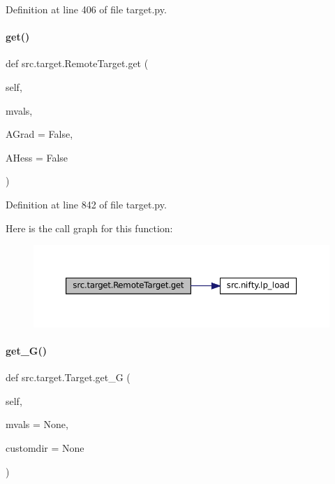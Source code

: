Definition at line 406 of file target.\+py.

\mbox{\label{classsrc_1_1target_1_1RemoteTarget_ad5a26180c653152b879d4cb82798aa23}} 
\paragraph{\texorpdfstring{get()}{get()}}
{\footnotesize\ttfamily def src.\+target.\+Remote\+Target.\+get (\begin{DoxyParamCaption}\item[{}]{self,  }\item[{}]{mvals,  }\item[{}]{A\+Grad = {\ttfamily False},  }\item[{}]{A\+Hess = {\ttfamily False} }\end{DoxyParamCaption})}



Definition at line 842 of file target.\+py.

Here is the call graph for this function\+:
\nopagebreak
\begin{figure}[H]
\begin{center}
\leavevmode
\includegraphics[width=350pt]{classsrc_1_1target_1_1RemoteTarget_ad5a26180c653152b879d4cb82798aa23_cgraph}
\end{center}
\end{figure}
\mbox{\label{classsrc_1_1target_1_1Target_abd888e5a08e9858fcf72dbad7133d538}} 
\paragraph{\texorpdfstring{get\+\_\+\+G()}{get\_G()}}
{\footnotesize\ttfamily def src.\+target.\+Target.\+get\+\_\+G (\begin{DoxyParamCaption}\item[{}]{self,  }\item[{}]{mvals = {\ttfamily None},  }\item[{}]{customdir = {\ttfamily None} }\end{DoxyParamCaption})\hspace{0.3cm}{\ttfamily [inherited]}}



